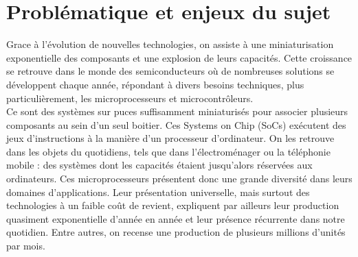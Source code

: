 
\section{Problématique et enjeux du sujet}
\label{chp:part1:issue_concern}

Grace à l'évolution de nouvelles technologies, on assiste à une
miniaturisation exponentielle des composants et une explosion de leurs
capacités. Cette croissance se retrouve dans le monde des semiconducteurs où
de nombreuses solutions se développent chaque année, répondant à divers
besoins techniques, plus particulièrement, les microprocesseurs et
microcontrôleurs. \\

Ce sont des systèmes sur puces suffisamment miniaturisés pour associer
plusieurs composants au sein d'un seul boitier. Ces Systems on Chip (SoCs)
exécutent des jeux d'instructions à la manière d'un processeur d'ordinateur.
On les retrouve dans les objets du quotidiens, tels que dans l'électroménager
ou la téléphonie mobile : des systèmes dont les capacités étaient jusqu'alors
réservées aux ordinateurs. Ces microprocesseurs présentent donc une grande
diversité dans leurs domaines d'applications. Leur présentation universelle,
mais surtout des technologies à un faible coût de revient, expliquent par
ailleurs leur production quasiment exponentielle d’année en année et leur
présence récurrente dans notre quotidien. Entre autres, on recense une
production de plusieurs millions d'unités par mois. \\



